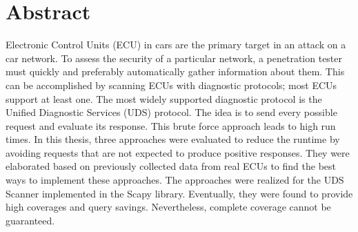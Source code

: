 \chapter*{\centering Abstract}

Electronic Control Units (ECU) in cars are the primary target in an attack on a car network. To assess the security of a particular network, a penetration tester must quickly and preferably automatically gather information about them. This can be accomplished by scanning ECUs with diagnostic protocols; most ECUs support at least one. The most widely supported diagnostic protocol is the Unified Diagnostic Services (UDS) protocol. The idea is to send every possible request and evaluate its response. This brute force approach leads to high run times. In this thesis, three approaches were evaluated to reduce the runtime by avoiding requests that are not expected to produce positive responses. They were elaborated based on previously collected data from real ECUs to find the best ways to implement these approaches. The approaches were realized for the UDS Scanner implemented in the Scapy library. Eventually, they were found to provide high coverages and query savings. Nevertheless, complete coverage cannot be guaranteed.
